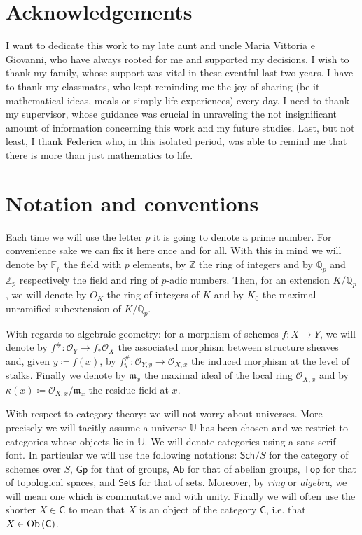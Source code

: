 \section*{Acknowledgements}
I want to dedicate this work to my late aunt and uncle Maria Vittoria e Giovanni,
who have always rooted for me and supported my decisions.
I wish to thank my family, whose support was vital in these eventful last two years.
I have to thank my classmates, who kept reminding me the joy of sharing
(be it mathematical ideas, meals or simply life experiences) every day.
I need to thank my supervisor, whose guidance was crucial in unraveling
the not insignificant amount of information concerning this work and my future studies.
Last, but not least, I thank Federica who, in this isolated period,
was able to remind me that there is more than just mathematics to life.
\newpage


\section*{Notation and conventions}
Each time we will use the letter $p$ it is going to denote a prime number.
For convenience sake we can fix it here once and for all.
With this in mind we will denote by $\mathbb{F}_{p}$ the field with $p$ elements,
by $\mathbb{Z}$ the ring of integers and by $\mathbb{Q}_p$ and $\mathbb{Z}_{p}$
respectively the field and ring of $p$-adic numbers.
Then, for an extension $K/\mathbb{Q}_p$, we will denote by $O_K$ the ring of
integers of $K$ and by $K_0$ the maximal unramified subextension of $K/\mathbb{Q}_p$.

With regards to algebraic geometry: for a morphism of schemes $f\colon X \to Y$,
we will denote by $f^{\#}\colon \mathcal{O}_{ Y } \to f_*\mathcal{O}_{ X }$ the
associated morphism between structure sheaves and, given $y \coloneqq f(x)$,
by $f_y^{\#}\colon \mathcal{O}_{ Y,y } \to \mathcal{O}_{ X,x }$ the induced morphism
at the level of stalks.
Finally we denote by $\mathfrak{m}_x$ the maximal ideal of the local ring
$\mathcal{O}_{ X,x }$ and by $\kappa(x) \coloneqq \mathcal{O}_{ X,x }/\mathfrak{m}_x$
the residue field at $x$.

With respect to category theory:
we will not worry about universes. More precisely we will
tacitly assume a universe $\mathbb{U}$ has been chosen
and we restrict to categories whose objects lie in $\mathbb{U}$.
We will denote categories using a sans serif font.
In particular we will use the following notations:
$\mathsf{Sch}/S$ for the category of schemes over $S$,
$\mathsf{Gp}$ for that of groups,
$\mathsf{Ab}$ for that of abelian groups,
$\mathsf{Top}$ for that of topological spaces,
and $\mathsf{Sets}$ for that of sets.
Moreover, by {\em ring} or {\em algebra}, we will mean one which is commutative and with unity.
Finally we will often use the shorter $X \in \mathsf{C}$ to mean that $X$ is an object
of the category $\mathsf{C}$, i.e. that $X \in \operatorname{Ob} \left(\mathsf{C}\right)$.
